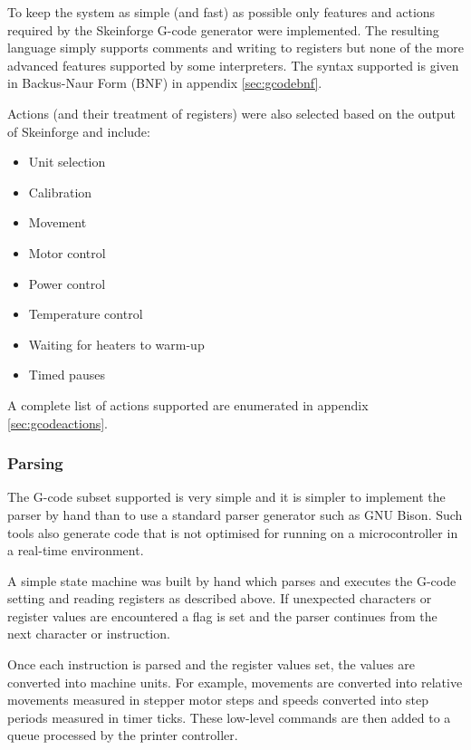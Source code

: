 				To keep the system as simple (and fast) as possible only features and
				actions required by the Skeinforge G-code generator were implemented.
				The resulting language simply supports comments and writing to registers
				but none of the more advanced features supported by some interpreters.
				The syntax supported is given in Backus-Naur Form (BNF) in appendix
				\ref{sec:gcodebnf}.
				
				Actions (and their treatment of registers) were also selected based on the
				output of Skeinforge and include:
				\begin{itemize}
					\item Unit selection
					\item Calibration
					\item Movement
					\item Motor control
					\item Power control
					\item Temperature control
					\item Waiting for heaters to warm-up
					\item Timed pauses
				\end{itemize}
				A complete list of actions supported are enumerated in appendix
				\ref{sec:gcodeactions}.
			
			\subsubsection{Parsing}
				
				The G-code subset supported is very simple and it is simpler to
				implement the parser by hand than to use a standard parser generator
				such as GNU Bison. Such tools also generate code that is not optimised
				for running on a microcontroller in a real-time environment.
				
				A simple state machine was built by hand which parses and executes the
				G-code setting and reading registers as described above. If unexpected
				characters or register values are encountered a flag is set and the
				parser continues from the next character or instruction.
				
				Once each instruction is parsed and the register values set, the values
				are converted into machine units. For example, movements are converted
				into relative movements measured in stepper motor steps and speeds
				converted into step periods measured in timer ticks. These low-level
				commands are then added to a queue processed by the printer controller.
		
